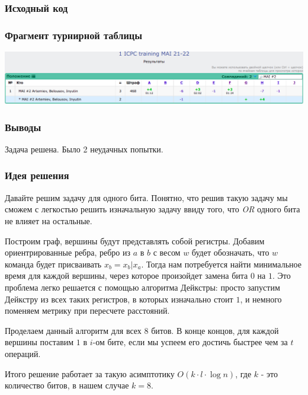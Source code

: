 \subsubsection*{Исходный код}

\subsubsection*{Фрагмент турнирной таблицы}
\includegraphics[width=\textwidth]{images/training1mai21.png}\newline\noindent
\subsubsection*{Выводы}
Задача решена. Было 2 неудачных попытки.
\pagebreak


\subsubsection*{Идея решения}
Давайте решим задачу для одного бита. Понятно, что решив такую задачу мы сможем с легкостью решить изначальную задачу ввиду того, что \textit{OR} одного бита не влияет на остальные.

Построим граф, вершины будут представлять собой регистры. Добавим ориентрированные ребра, ребро из $a$ в $b$ с весом $w$ будет обозначать, что $w$ команда будет присваивать $x_b = x_b | x_a$. Тогда нам потребуется найти минимальное время для каждой вершины, через которое произойдет замена бита $0$ на $1$. Это проблема легко решается с помощью алгоритма Дейкстры: просто запустим Дейкстру из всех таких регистров, в которых изначально стоит $1$, и немного поменяем метрику при пересчете расстояний.

Проделаем данный алгоритм для всех $8$ битов. В конце концов, для каждой вершины поставим $1$ в $i$-ом бите, если мы успеем его достичь быстрее чем за $t$ операций.

Итого решение работает за такую асимптотику $O(k \cdot l \cdot \log{n})$, где $k$ - это количество битов, в нашем случае $k = 8$.

